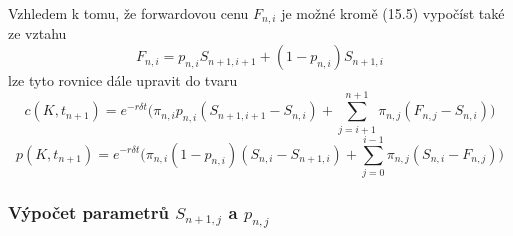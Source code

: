 \documentclass[a4paper]{book}
\begin{document}
Vzhledem k tomu, že forwardovou cenu $F_{n,i}$ je možné kromě (15.5) vypočíst také ze vztahu
\begin{equation}
F_{n,i} = p_{n,i}S_{n+1,i+1} + (1-p_{n,i})S_{n+1,i}
\end{equation}
lze tyto rovnice dále upravit do tvaru
\begin{equation}
c(K, t_{n+1}) = e^{-r \delta t} \bigg( \pi_{n,i}p_{n,i}(S_{n+1,i+1}-S_{n,i}) + \sum_{j=i+1}^{n+1}\pi_{n,j}(F_{n,j}-S_{n,i}) \bigg)
\end{equation}
\begin{equation}
p(K, t_{n+1}) = e^{-r \delta t} \bigg( \pi_{n,i}(1-p_{n,i})(S_{n,i}-S_{n+1,i}) + \sum_{j=0}^{i-1}\pi_{n,j}(S_{n,i}-F_{n,j}) \bigg)
\end{equation}

\subsubsection{Výpočet parametrů $S_{n+1,j}$ a $p_{n,j}$}
\end{document}
